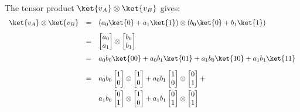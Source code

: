 The tensor product $\ket{v_{A}} \otimes \ket{v_{B}}$ gives:
\begin{equation}\label{eq: Tensor Product}
    \begin{array}{rcl}
        \ket{v_{A}} \otimes \ket{v_{B}} &=& \left( a_{0} \ket{0} + a_{1} \ket{1} \right) \otimes \left( b_{0} \ket{0} + b_{1} \ket{1} \right)   \\ [.8em]
                                        &=& \begin{bmatrix} a_{0} \\ a_{1} \end{bmatrix} \otimes \begin{bmatrix} b_{0} \\ b_{1} \end{bmatrix}   \\ [1.2em]
                                        &=& a_{0}b_{0} \ket{00} + a_{0}b_{1} \ket{01} + a_{1}b_{0} \ket{10} + a_{1}b_{1} \ket{11}               \\ [1em]
                                        &=& a_{0}b_{0} \begin{bmatrix} 1 \\ 0 \end{bmatrix} \otimes \begin{bmatrix} 1 \\ 0 \end{bmatrix} +
                                            a_{0}b_{1} \begin{bmatrix} 1 \\ 0 \end{bmatrix} \otimes \begin{bmatrix} 0 \\ 1 \end{bmatrix} +      \\ [1em]
                                        & & a_{1}b_{0} \begin{bmatrix} 0 \\ 1 \end{bmatrix} \otimes \begin{bmatrix} 1 \\ 0 \end{bmatrix} +
                                            a_{1}b_{1} \begin{bmatrix} 0 \\ 1 \end{bmatrix} \otimes \begin{bmatrix} 0 \\ 1 \end{bmatrix}        \\ [1.2em]

\end{array}
\end{equation}
